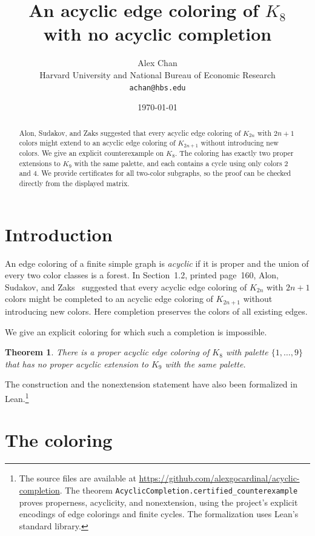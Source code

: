 \documentclass[11pt]{article}
\title{An acyclic edge coloring of \(K_8\)\\
with no acyclic completion}
\author{Alex Chan\\[2pt]
  \small Harvard University and National Bureau of Economic Research\\[-1pt]
  \small \texttt{achan@hbs.edu}}
\date{\today}
\newtheorem{theorem}{Theorem}
\begin{document}
\maketitle

\begin{abstract}
Alon, Sudakov, and Zaks suggested that every acyclic edge coloring
of \(K_{2n}\) with \(2n+1\) colors might extend to an acyclic edge
coloring of \(K_{2n+1}\) without introducing new colors.
We give an explicit counterexample on \(K_8\).
The coloring has exactly two proper extensions to \(K_9\) with the
same palette, and each contains a cycle using only colors \(2\) and \(4\).
We provide certificates for all two-color subgraphs, so the proof
can be checked directly from the displayed matrix.
\end{abstract}

\section{Introduction}

An edge coloring of a finite simple graph is \emph{acyclic} if it
is proper and the union of every two color classes is a forest.
In Section~1.2, printed page~160, Alon, Sudakov, and Zaks~\cite{ASZ}
suggested that every acyclic edge coloring of \(K_{2n}\) with
\(2n+1\) colors might be completed to an acyclic edge coloring of
\(K_{2n+1}\) without introducing new colors.
Here completion preserves the colors of all existing edges.

We give an explicit coloring for which such a completion is
impossible.

\begin{theorem}\label{thm:main}
There is a proper acyclic edge coloring of \(K_8\) with palette
\(\{1,\ldots,9\}\) that has no proper acyclic extension to \(K_9\)
with the same palette.
\end{theorem}

The construction and the nonextension statement have also been
formalized in Lean.\footnote{The source files are available at
\url{https://github.com/alexgocardinal/acyclic-completion}.
The theorem
\texttt{AcyclicCompletion.certified\_counterexample}
proves properness, acyclicity, and nonextension, using the project's
explicit encodings of edge colorings and finite cycles.
The formalization uses Lean's standard library.}

\section{The coloring}
\end{document}
